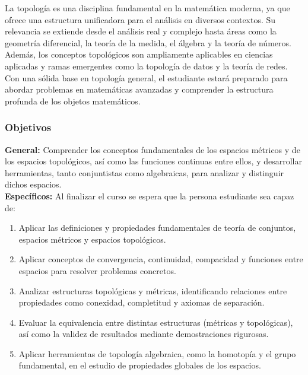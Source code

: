 \begin{refsection}
La topología es una disciplina fundamental en la matemática moderna, ya que ofrece una estructura unificadora para el análisis en diversos contextos. Su relevancia se extiende desde el análisis real y complejo hasta áreas como la geometría diferencial, la teoría de la medida, el álgebra y la teoría de números. Además, los conceptos topológicos son ampliamente aplicables en ciencias aplicadas y ramas emergentes como la topología de datos y la teoría de redes. Con una sólida base en topología general, el estudiante estará preparado para abordar problemas en matemáticas avanzadas y comprender la estructura profunda de los objetos matemáticos.



\subsubsection*{Objetivos}

\textbf{General:} Comprender los conceptos fundamentales de los espacios métricos y de los espacios topológicos, así como las funciones continuas entre ellos, y desarrollar herramientas, tanto conjuntistas como algebraicas, para analizar y distinguir dichos espacios. \\

\textbf{Específicos:} Al finalizar el curso se espera que la persona estudiante sea capaz de:

\begin{enumerate}
\item Aplicar las definiciones y propiedades fundamentales de teoría de conjuntos, espacios métricos y espacios topológicos.


\item Aplicar conceptos de convergencia, continuidad, compacidad y funciones entre espacios para resolver problemas concretos.


\item Analizar estructuras topológicas y métricas, identificando relaciones entre propiedades como conexidad, completitud y axiomas de separación.


\item Evaluar la equivalencia entre distintas estructuras (métricas y topológicas), así como la validez de resultados mediante demostraciones rigurosas.


\item Aplicar herramientas de topología algebraica, como la homotopía y el grupo fundamental, en el estudio de propiedades globales de los espacios.



\end{enumerate}
\end{refsection}
